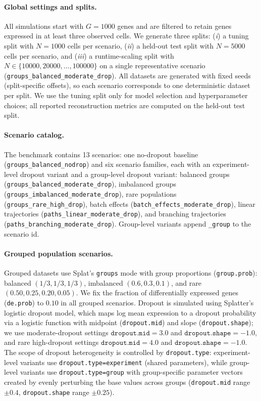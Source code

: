 
\paragraph{Global settings and splits.}
All simulations start with $G=1000$ genes and are filtered to retain genes
expressed in at least three observed cells. We generate three splits:
(\textit{i}) a tuning split with $N=1000$ cells per scenario,
(\textit{ii}) a held-out test split with $N=5000$ cells per scenario, and
(\textit{iii}) a runtime-scaling split with
$N\in\{10000,20000,\ldots,100000\}$ on a single representative scenario
(\texttt{groups\_balanced\_moderate\_drop}). All datasets are generated with
fixed seeds (split-specific offsets), so each scenario corresponds to one
deterministic dataset per split.
We use the tuning split only for model selection and hyperparameter choices;
all reported reconstruction metrics are computed on the held-out test split.

\paragraph{Scenario catalog.}
The benchmark contains 13 scenarios: one no-dropout baseline
(\texttt{groups\_balanced\_nodrop}) and six scenario families, each with an
experiment-level dropout variant and a group-level dropout variant:
balanced groups (\texttt{groups\_balanced\_moderate\_drop}),
imbalanced groups (\texttt{groups\_imbalanced\_moderate\_drop}),
rare populations (\texttt{groups\_rare\_high\_drop}),
batch effects (\texttt{batch\_effects\_moderate\_drop}),
linear trajectories (\texttt{paths\_linear\_moderate\_drop}), and
branching trajectories (\texttt{paths\_branching\_moderate\_drop}).
Group-level variants append \texttt{\_group} to the scenario id.

\paragraph{Grouped population scenarios.}
Grouped datasets use Splat's \texttt{groups} mode with group proportions
(\texttt{group.prob}): balanced $(1/3,1/3,1/3)$, imbalanced $(0.6,0.3,0.1)$, and
rare $(0.50,0.25,0.20,0.05)$. We fix the fraction of differentially expressed
genes (\texttt{de.prob}) to $0.10$ in all grouped scenarios.
Dropout is simulated using Splatter's logistic dropout model, which maps log
mean expression to a dropout probability via a logistic function with midpoint
(\texttt{dropout.mid}) and slope (\texttt{dropout.shape}); we use
moderate-dropout settings $\texttt{dropout.mid}=3.0$ and
$\texttt{dropout.shape}=-1.0$, and rare high-dropout settings
$\texttt{dropout.mid}=4.0$ and $\texttt{dropout.shape}=-1.0$.
The scope of dropout heterogeneity is controlled by \texttt{dropout.type}:
experiment-level variants use \texttt{dropout.type=experiment} (shared
parameters), while group-level variants use \texttt{dropout.type=group} with
group-specific parameter vectors created by evenly perturbing the base values
across groups (\texttt{dropout.mid} range $\pm 0.4$, \texttt{dropout.shape}
range $\pm 0.25$).

